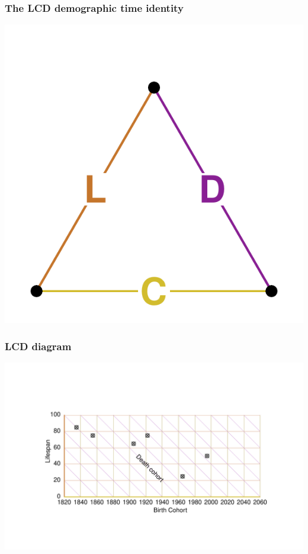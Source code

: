 \documentclass[20pt]{beamer}
\begin{document}

\begin{frame}
\frametitle{The LCD demographic time identity}
\vspace{-4em}
\begin{center}
\includegraphics[scale=1.7]{Figures/LCDid.pdf}
\end{center}
\end{frame}


\begin{frame}
\frametitle{LCD diagram}
\begin{center}
\includegraphics[trim= 200 200 200 200, scale=1.5]{Figures/LCDrt.pdf}
\end{center}
\end{frame}
\end{document}
